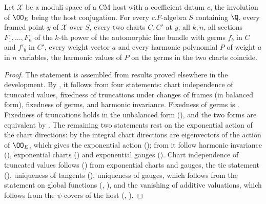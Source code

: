 \begin{proposition}\label{pf:onto3:chartindep}
Let $\mathcal X$ be a moduli space of a CM host with a coefficient datum $c$, the involution of $\OO_E$ being the host
conjugation. For every $c.F$-algebra $S$ containing $\Q$, every framed point $y$ of $\mathcal X$ over $S$, every two charts
$C,C'$ at $y$, all $k,n$, all sections $F_1,\dots,F_n$ of the $k$-th power of the automorphic line bundle with germs $f_b$ in
$C$ and $f'_b$ in $C'$, every weight vector $a$ and every harmonic polynomial $P$ of weight $a$ in $n$ variables, the
harmonic values of $P$ on the germs in the two charts coincide.
\end{proposition}

\begin{proof}
The statement is assembled from results proved elsewhere in the development. By
, it follows from four statements: chart
independence of truncated values, fixedness of truncations under changes of frames (in balanced form), fixedness of
germs, and harmonic invariance. Fixedness of germs is .
Fixedness of truncations holds in the unbalanced form (),
and the two forms are equivalent by . The remaining two statements
rest on the exponential action of the chart directions: by  the integral chart
directions are eigenvectors of the action of $\OO_E$, which gives the exponential action
(); from it follow harmonic invariance
(), exponential charts
() and exponential gauges
(). Chart independence of truncated values
follows () from exponential charts and gauges,
the tie statement (), uniqueness of tangents
(), uniqueness of gauges, which follows from
the statement on global functions (,
), and the vanishing of additive valuations, which follows from the
$\psi$-covers of the host (,
).
\end{proof}

